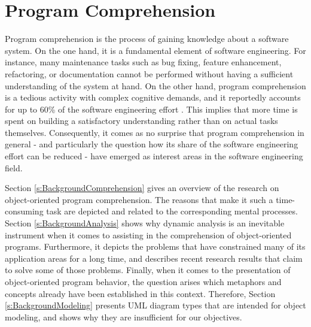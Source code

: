 \chapter{Program Comprehension}
\label{c:Background}
Program comprehension is the process of gaining knowledge about a software system.
On the one hand, it is a fundamental element of software engineering.
For instance, many maintenance tasks such as bug fixing, feature enhancement, refactoring, or documentation cannot be performed without having a sufficient understanding of the system at hand. On the other hand, program comprehension is a tedious activity with complex cognitive demands, and it reportedly accounts for up to 60\% of the software engineering effort \cite{corbi_program_1989, basili_evolving_1997}.
This implies that more time is spent on building a satisfactory understanding rather than on actual tasks themselves.
Consequently, it comes as no surprise that program comprehension in general - and particularly the question how its share of the software engineering effort can be reduced - have emerged as interest areas in the software engineering field.

Section \ref{s:BackgroundComprehension} gives an overview of the research on object-oriented program comprehension.
The reasons that make it such a time-consuming task are depicted and related to the corresponding mental processes.
Section \ref{s:BackgroundAnalysis} shows why dynamic analysis is an inevitable instrument when it comes to assisting in the comprehension of object-oriented programs.
Furthermore, it depicts the problems that have constrained many of its application areas for a long time, and describes recent research results that claim to solve some of those problems.
Finally, when it comes to the presentation of object-oriented program behavior, the question arises which metaphors and concepts already have been established in this context.
Therefore, Section \ref{s:BackgroundModeling} presents UML diagram types that are intended for object modeling, and shows why they are insufficient for our objectives. 

